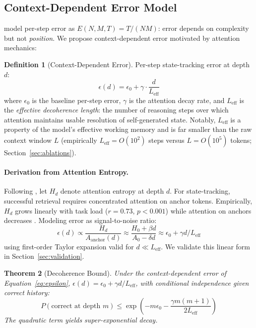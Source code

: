 \documentclass{article}
\theoremstyle{plain}
\newtheorem{theorem}{Theorem}[section]
\theoremstyle{definition}
\newtheorem{definition}[theorem]{Definition}
\theoremstyle{remark}
\newcommand{\Leff}{L_{\mathrm{eff}}}
\begin{document}
\subsection{Context-Dependent Error Model}

\citet{wu2025more} model per-step error as $E(N, M, T) = T/(NM)$: error depends on complexity but not \emph{position}. We propose context-dependent error motivated by attention mechanics:

\begin{definition}[Context-Dependent Error]
\label{def:context_error}
Per-step state-tracking error at depth $d$:
\begin{equation}
\epsilon(d) = \epsilon_0 + \gamma \cdot \frac{d}{\Leff}
\label{eq:epsilon}
\end{equation}
where $\epsilon_0$ is the baseline per-step error, $\gamma$ is the attention decay rate, and $\Leff$ is the \emph{effective decoherence length}: the number of reasoning steps over which attention maintains usable resolution of self-generated state. Notably, $\Leff$ is a property of the model's effective working memory and is far smaller than the raw context window $L$ (empirically $\Leff = O(10^2)$ steps versus $L = O(10^5)$ tokens; Section~\ref{sec:ablations}).
\end{definition}

\paragraph{Derivation from Attention Entropy.} Following \citet{gong2024attention}, let $H_d$ denote attention entropy at depth $d$. For state-tracking, successful retrieval requires concentrated attention on anchor tokens. Empirically, $H_d$ grows linearly with task load ($r=0.73$, $p<0.001$) while attention on anchors decreases \citep{xiao2024efficient,liu2023lost}. Modeling error as signal-to-noise ratio:
\begin{equation}
\epsilon(d) \propto \frac{H_d}{A_{\text{anchor}}(d)} \approx \frac{H_0 + \beta d}{A_0 - \delta d} \approx \epsilon_0 + \gamma d/\Leff
\end{equation}
using first-order Taylor expansion valid for $d \ll \Leff$. We validate this linear form in Section~\ref{sec:validation}.

\begin{theorem}[Decoherence Bound]
\label{thm:decoherence}
Under the context-dependent error of Equation~\eqref{eq:epsilon}, $\epsilon(d) = \epsilon_0 + \gamma d/\Leff$, with conditional independence given correct history:
\begin{equation}
P(\text{correct at depth } m) \leq \exp\left(-m\epsilon_0 - \frac{\gamma m(m+1)}{2\Leff}\right)
\end{equation}
The quadratic term yields super-exponential decay.
\end{theorem}
\end{document}
